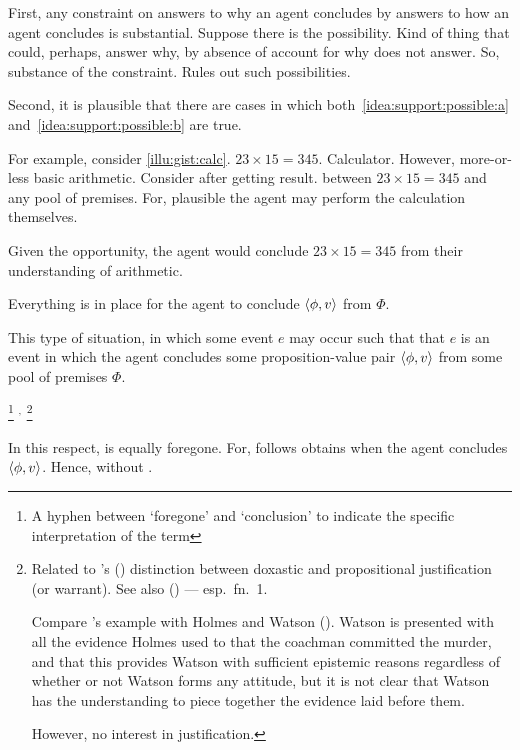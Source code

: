 \begin{note}
  First, any constraint on answers to why an agent concludes by answers to how an agent concludes is substantial.
  Suppose there is the possibility.
  Kind of thing that could, perhaps, answer why, by absence of  account for why does not answer.
  So, substance of the constraint.
  Rules out such possibilities.
\end{note}

\begin{note}
  Second, it is plausible that there are cases in which both~\ref{idea:support:possible:a} and~\ref{idea:support:possible:b} are true.

  For example, consider \autoref{illu:gist:calc}.
  \(23 \times 15 = 345\).
  Calculator.
  However, more-or-less basic arithmetic.
  Consider after getting result.
  \ros{} between \(23 \times 15 = 345\) and any pool of premises.
  For, plausible the agent may perform the calculation themselves.

  Given the opportunity, the agent would conclude \(23 \times 15 = 345\) from their understanding of arithmetic.

  Everything is in place for the agent to conclude \(\langle \phi, v \rangle\) from \(\Phi\).

  This type of situation, in which some event \(e\) may occur such that that \(e\) is an event in which the agent concludes some proposition-value pair \(\langle \phi, v \rangle\) from some pool of premises \(\Phi\).

  \fc{}%
  \footnote{
    A hyphen between `foregone' and `conclusion' to indicate the specific interpretation of the term
  }%
  \(^{,}\)%
  \footnote{
    Related to \citeauthor{Firth:1978vi}'s (\citeyear{Firth:1978vi}) distinction between doxastic and propositional justification (or warrant).
    See also \citeauthor{Silva:2020aa} (\citeyear{Silva:2020aa}) --- esp.\ fn.\ 1.

    {\color{red}
      Compare \citeauthor{Firth:1978vi}'s example with Holmes and Watson (\citeyear[218]{Firth:1978vi}).
      Watson is presented with all the evidence Holmes used to that the coachman committed the murder, and that this provides Watson with sufficient epistemic reasons regardless of whether or not Watson forms any attitude, but it is not clear that Watson has the understanding to piece together the evidence laid before them.
    }

    However, no interest in justification.
  }

  In this respect, \ros{} is equally foregone.
  For, \ros{} follows obtains when the agent concludes \(\langle \phi, v \rangle\).
  Hence, \ros{} without .
\end{note}

